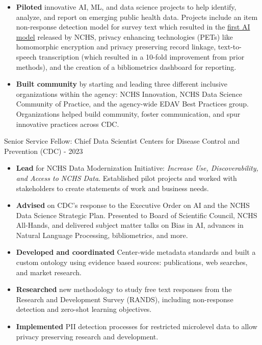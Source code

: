 \documentclass[]{scrartcl}
\begin{document}
\begin{cleanCV}
{\begin{itemize}
  \item \textbf{Piloted} innovative AI, ML, and data science projects to help identify, analyze, and report on emerging public health data. Projects include an item non-response detection model for survey text which resulted in the \href{https://www.cdc.gov/nchs/data-analysis-tools/sands.html}{first AI model} released by NCHS, privacy enhancing technologies (PETs) like homomorphic encryption and privacy preserving record linkage, text-to-speech transcription (which resulted in a 10-fold improvement from prior methods), and the creation of a bibliometrics dashboard for reporting.

      \item \textbf{Built community} by starting and leading three different inclusive organizations within the agency: NCHS Innovation, NCHS Data Science Community of Practice, and the agency-wide EDAV Best Practices group. Organizations helped build community, foster communication, and spur innovative practices across CDC.
    

  \end{itemize}
}

\vspace{1em}

    
\WorkExperience
{}
{Senior Service Fellow: Chief Data Scientist}
{
  \newline Centers for Disease Control and Prevention (CDC)
   - 2023
}
{
  \vspace{-0.25em}
  \begin{itemize}

   \item \textbf{Lead} for NCHS Data Modernization Initiative: \emph{Increase Use, Discoverability, and Access to NCHS Data}. Established pilot projects and worked with stakeholders to create statements of work and business needs.
   \item \textbf{Advised} on CDC's response to the Executive Order on AI and the NCHS Data Science Strategic Plan. Presented to Board of Scientific Council, NCHS All-Hands, and delivered subject matter talks on Bias in AI, advances in Natural Language Processing, bibliometrics, and more.
   \item \textbf{Developed and coordinated} Center-wide metadata standards and built a custom ontology using evidence based sources: publications, web searches, and market research.
   \item \textbf{Researched} new methodology to study free text responses from the Research and Development Survey (RANDS), including non-response detection and zero-shot learning objectives.
   \item \textbf{Implemented} PII detection processes for restricted microlevel data to allow privacy preserving research and development.
  \end{itemize}
}
  

\end{cleanCV}
\end{document}

